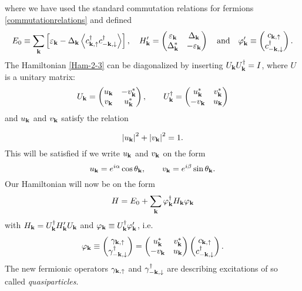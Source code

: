 where we have used the standard commutation relations for fermions \eqref{commutationrelations} and defined 
\begin{equation*}
    E_0 \equiv \sum_{\bf{k}} \left[ \varepsilon_{\mathbf{k}} - \Delta_{\bf{k}}\left<c_{\bf{k},\uparrow}^{\dagger} c_{-\bf{k},\downarrow}^{\dagger} \right> \right],
    \quad
    H_{\mathbf{k}}' = 
    \begin{pmatrix}
        \varepsilon_{\bf{k}} & \Delta_{\bf{k}}\\
        \Delta_{\bf{k}}^* & -\varepsilon_{\bf{k}} 
    \end{pmatrix}
    \quad \mathrm{and} \quad 
    \varphi_{\mathbf{k}}' \equiv \begin{pmatrix} c_{\bf{k},\uparrow} \\ c_{-\bf{k},\downarrow}^{\dagger} \end{pmatrix}.
\end{equation*}
The Hamiltonian \eqref{Ham-2-3} can be diagonalized by inserting $U_{\mathbf{k}}U_{\mathbf{k}}^{\dagger} = I$, where $U$ is a unitary matrix:
\begin{equation}
U_{\mathbf{k}} =
\begin{pmatrix}
    u_{\mathbf{k}} & -v_{\mathbf{k}}^* \\
    v_{\mathbf{k}} & u_{\mathbf{k}}^*
\end{pmatrix},
\qquad
U_{\mathbf{k}}^{\dagger} = 
\begin{pmatrix}
    u_{\mathbf{k}}^* & v_{\mathbf{k}}^* \\
    -v_{\mathbf{k}} & u_{\mathbf{k}}
\end{pmatrix}
\end{equation}
and $u_{\mathbf{k}}$ and $v_{\mathbf{k}}$ satisfy the relation

\begin{equation}
\left| u_{\mathbf{k}} \right |^2 + \left| v_{\mathbf{k}} \right |^2 = 1.
\label{unitary}
\end{equation}
This will be satisfied if we write $u_{\mathbf{k}}$ and $v_{\mathbf{k}}$ on the form
\begin{equation}
u_{\mathbf{k}} = e^{i\alpha}\cos\theta_{\mathbf{k}},
\qquad
v_{\mathbf{k}} = e^{i\beta}\sin\theta_{\mathbf{k}}.
\label{uv}
\end{equation}
Our Hamiltonian will now be on the form 
\begin{equation}
H = E_0 + \sum_{\mathbf{k}}\varphi_{\mathbf{k}}^{\dagger}H_{\mathbf{k}}\varphi_{\mathbf{k}}
\label{Ham-diag}
\end{equation}
with $H_{\mathbf{k}} = U_{\mathbf{k}}^{\dagger}H_{\mathbf{k}}'U_{\mathbf{k}}$ and  $\varphi_{\mathbf{k}} \equiv U_{\mathbf{k}}^{\dagger}\varphi'_{\mathbf{k}}$, i.e.
\begin{equation}
\varphi_{\mathbf{k}} \equiv 
\begin{pmatrix}
    \gamma_{\bf{k},\uparrow} \\ \gamma_{-\bf{k},\downarrow}^{\dagger}
\end{pmatrix}
=
\begin{pmatrix}
    u_{\mathbf{k}}^* & v_{\mathbf{k}}^*\\
    -v_{\mathbf{k}} & u_{\mathbf{k}}
\end{pmatrix}
\begin{pmatrix}
    c_{\bf{k},\uparrow} \\ c_{-\bf{k},\downarrow}^{\dagger}
\end{pmatrix}.
\label{quasi}
\end{equation}
 The new fermionic operators $\gamma_{\bf{k},\uparrow}$ and $\gamma_{-\bf{k},\downarrow}^{\dagger}$ are describing excitations of so called \textit{quasiparticles}.
 
